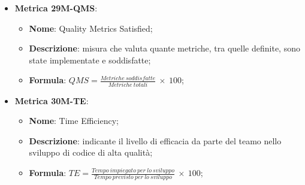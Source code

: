 \begin{itemize}
    \item \textbf{Metrica 29M-QMS}:
    \begin{itemize}
        \item \textbf{Nome}: Quality Metrics Satisfied;
        \item \textbf{Descrizione}: misura che valuta quante metriche, tra quelle definite, sono state implementate e soddisfatte;
        \item \textbf{Formula}: $QMS = \frac{Metriche\: soddisfatte}{Metriche\: totali}\: \times \: 100$;
    \end{itemize}
\end{itemize}

\begin{itemize}
    \item \textbf{Metrica 30M-TE}:
    \begin{itemize}
        \item \textbf{Nome}: Time Efficiency;
        \item \textbf{Descrizione}: indicante il livello di efficacia da parte del teamo nello sviluppo di codice di alta qualità;
        \item \textbf{Formula}: $TE = \frac{Tempo\: impiegato\: per\: lo\: sviluppo}{Tempo\: previsto\: per\: lo\: sviluppo}\: \times \: 100$;
    \end{itemize}
\end{itemize}